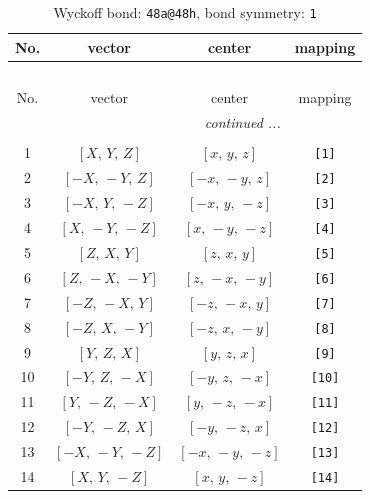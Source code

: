 \documentclass[fleqn,8pt]{jsarticle}
\begin{document}
\begin{longtable}{cccc}
\caption{Wyckoff bond: {\tt 48a@48h}, bond symmetry: {\tt 1}}
 \\
 \hline \hline
No. & vector & center & mapping \\ \hline \endfirsthead

\multicolumn{3}{l}{\tablename\ \thetable{}} \\
 \hline \hline
No. & vector & center & mapping \\ \hline \endhead

 \hline \hline
\multicolumn{3}{r}{\footnotesize\it continued ...} \\ \endfoot

 \hline \hline
\multicolumn{3}{r}{} \\ \endlastfoot

1 & $\left[ X,\, Y,\, Z \right]$ & $\left[ x,\, y,\, z \right]$ & {\tt [1]} \\ \hline
2 & $\left[ - X,\, - Y,\, Z \right]$ & $\left[ - x,\, - y,\, z \right]$ & {\tt [2]} \\ \hline
3 & $\left[ - X,\, Y,\, - Z \right]$ & $\left[ - x,\, y,\, - z \right]$ & {\tt [3]} \\ \hline
4 & $\left[ X,\, - Y,\, - Z \right]$ & $\left[ x,\, - y,\, - z \right]$ & {\tt [4]} \\ \hline
5 & $\left[ Z,\, X,\, Y \right]$ & $\left[ z,\, x,\, y \right]$ & {\tt [5]} \\ \hline
6 & $\left[ Z,\, - X,\, - Y \right]$ & $\left[ z,\, - x,\, - y \right]$ & {\tt [6]} \\ \hline
7 & $\left[ - Z,\, - X,\, Y \right]$ & $\left[ - z,\, - x,\, y \right]$ & {\tt [7]} \\ \hline
8 & $\left[ - Z,\, X,\, - Y \right]$ & $\left[ - z,\, x,\, - y \right]$ & {\tt [8]} \\ \hline
9 & $\left[ Y,\, Z,\, X \right]$ & $\left[ y,\, z,\, x \right]$ & {\tt [9]} \\ \hline
10 & $\left[ - Y,\, Z,\, - X \right]$ & $\left[ - y,\, z,\, - x \right]$ & {\tt [10]} \\ \hline
11 & $\left[ Y,\, - Z,\, - X \right]$ & $\left[ y,\, - z,\, - x \right]$ & {\tt [11]} \\ \hline
12 & $\left[ - Y,\, - Z,\, X \right]$ & $\left[ - y,\, - z,\, x \right]$ & {\tt [12]} \\ \hline
13 & $\left[ - X,\, - Y,\, - Z \right]$ & $\left[ - x,\, - y,\, - z \right]$ & {\tt [13]} \\ \hline
14 & $\left[ X,\, Y,\, - Z \right]$ & $\left[ x,\, y,\, - z \right]$ & {\tt [14]} \\ \hline

\end{longtable}
\end{document}
